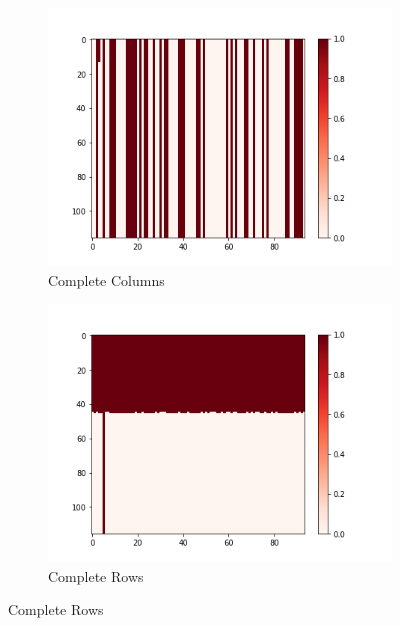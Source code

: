 \documentclass[10pt, conference, compsocconf]{IEEEtran}
\begin{document}
\begin{figure}[h!]
        \centering
        \begin{subfigure}[b]{0.4\linewidth}
                  \includegraphics[width=\columnwidth]{figures/5vs7_columns_04_training}
                  \caption{Complete Columns}
                  \label{fig:Columns-Sample-Training-set}
        \end{subfigure}
        \begin{subfigure}[b]{0.4\linewidth}
                  \includegraphics[width=\columnwidth]{figures/5vs7_rows_04_training}
                  \caption{Complete Rows}
                  \label{fig:Rows-Sample-Training-set}
        \end{subfigure}

\end{figure}
\end{document}
